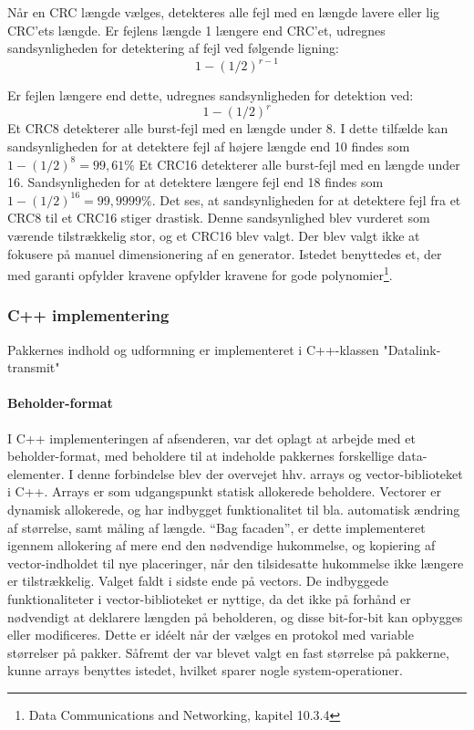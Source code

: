 Når en CRC længde vælges, detekteres alle fejl med en længde lavere eller lig CRC'ets længde. Er fejlens længde 1 længere end CRC'et, udregnes sandsynligheden for detektering af fejl ved følgende ligning:
\begin{equation}
\label{eq:CRCError}
1-(1/2)^{r-1}
\end{equation}

Er fejlen længere end dette, udregnes sandsynligheden for detektion ved:
\begin{equation}
\label{eq:CRCError2}
1-(1/2)^r
\end{equation}
Et CRC8 detekterer alle burst-fejl med en længde under 8. I dette tilfælde kan sandsynligheden for at detektere fejl af højere længde end 10 findes som $1-(1/2)^8 = 99,61\%$
Et CRC16 detekterer alle burst-fejl med en længde under 16. Sandsynligheden for at detektere længere fejl end 18 findes som $1-(1/2)^{16} = 99,9999\%.$
	Det ses, at sandsynligheden for at detektere fejl fra et CRC8 til et CRC16 stiger drastisk. Denne sandsynlighed blev vurderet som værende tilstrækkelig stor, og et CRC16 blev valgt.
    Der blev valgt ikke at fokusere på manuel dimensionering af en generator. Istedet benyttedes et, der med garanti opfylder kravene opfylder kravene for gode polynomier\footnote{Data Communications and Networking, kapitel 10.3.4}.


\subsubsection{C++ implementering}
Pakkernes indhold og udformning er implementeret i C++-klassen "Datalink-transmit"

\paragraph{Beholder-format}\hfill \break
I C++ implementeringen af afsenderen, var det oplagt at arbejde med et beholder-format, med beholdere til at indeholde pakkernes forskellige data-elementer.
I denne forbindelse blev der overvejet hhv. arrays og vector-biblioteket i C++. 
Arrays er som udgangspunkt statisk allokerede beholdere.
Vectorer er dynamisk allokerede, og har indbygget funktionalitet til bla. automatisk ændring af størrelse, samt måling af længde. “Bag facaden”, er dette implementeret igennem allokering af mere end den nødvendige hukommelse, og kopiering af vector-indholdet til nye placeringer, når den tilsidesatte hukommelse ikke længere er tilstrækkelig. 
Valget faldt i sidste ende på vectors. De indbyggede funktionaliteter i vector-biblioteket er nyttige, da det ikke på forhånd er nødvendigt at deklarere længden på beholderen, og disse bit-for-bit kan opbygges eller modificeres. Dette er idéelt når der vælges en protokol med variable størrelser på pakker. Såfremt der var blevet valgt en fast størrelse på pakkerne, kunne arrays benyttes istedet, hvilket sparer nogle system-operationer.

